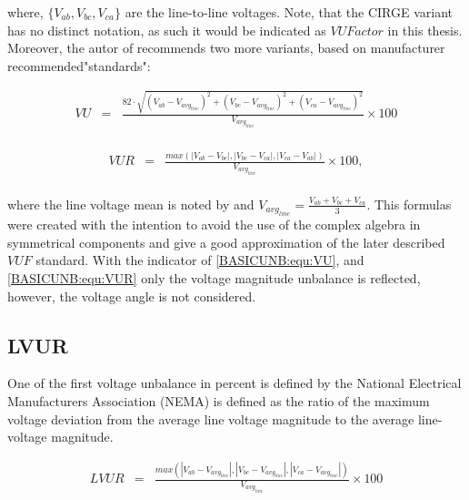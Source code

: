 		where, $\{V_{ab},V_{bc},V_{ca}\}$ are the line-to-line voltages. Note, that the CIRGE variant has no distinct notation, as such it would be indicated as $VUFactor$ in this thesis. Moreover, the autor of \cite{robert1992assessing} recommends two more variants, based on manufacturer recommended"standards": 
		
		\begin{equation}
        \begin{array}{rcl}
            VU&=&\frac{82\cdot\sqrt{(V_{ab}-V_{avg_{line}})^2+(V_{bc}-V_{avg_{line}})^2+(V_{ca}-V_{avg_{line}})^2}}{V_{avg_{line}}}\times100\\					
        \end{array}
        \label{BASICUNB:equ:VU}
    \end{equation}
		
		\begin{equation}
        \begin{array}{rcl}
            VUR&=&\frac{max\left( |V_{ab}-V_{bc}|,|V_{bc}-V_{ca}|,|V_{ca}-V_{ab}| \right)}{V_{avg_{line}}}\times100,\\				
        \end{array}
        \label{BASICUNB:equ:VUR}
    \end{equation}
		
		where the line voltage mean is noted by and $V_{avg_{line}}=\frac{V_{ab}+V_{bc}+V_{ca}}{3}$.
		This formulas were created with the intention to avoid the use of the complex algebra in symmetrical components and give
a good approximation of the later described $VUF$ standard. With the indicator of \ref{BASICUNB:equ:VU}, and \ref{BASICUNB:equ:VUR} only the voltage magnitude unbalance is reflected, however, the voltage angle is not considered. 

	
	\subsection{LVUR}
	
	One of the first voltage unbalance in percent is defined by the National Electrical Manufacturers Association (NEMA) \cite{bonnett1997understanding} is defined  as the ratio of the maximum voltage deviation from the average line voltage magnitude to the average line-voltage magnitude.
	
\begin{equation}
        \begin{array}{rcl}
            LVUR&=&\frac{max\left( |V_{ab}-V_{avg_{line}}|,|V_{bc}-V_{avg_{line}}|,|V_{ca}-V_{avg_{line}}| \right)}{V_{avg_{line}}}\times100\\			
        \end{array}
        \label{BASICUNB:equ:LVUR}
    \end{equation}
		
